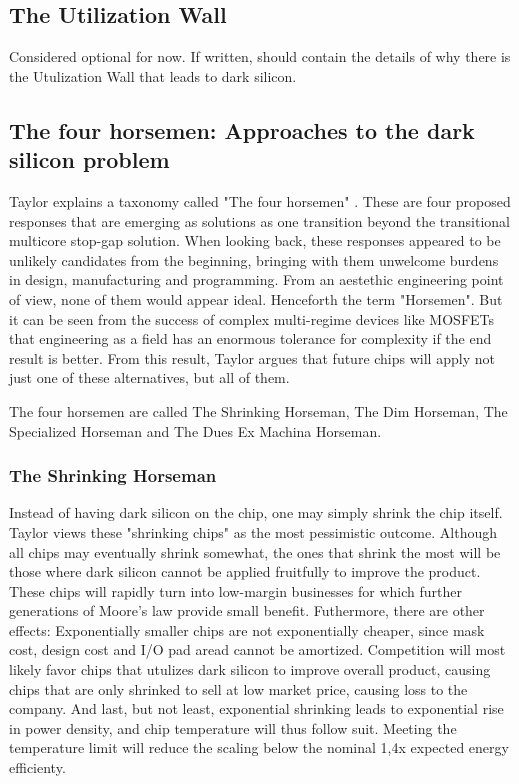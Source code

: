 \subsection{The Utilization Wall}
Considered optional for now.
If written, should contain the details of why there is the Utulization Wall that leads to dark silicon. 

\subsection{The four horsemen: Approaches to the dark silicon problem}
Taylor explains a taxonomy called "The four horsemen" \cite{dark-silicon}.
These are four proposed responses that are emerging as solutions as one transition beyond the transitional multicore stop-gap solution. \cite{dark-silicon2}
When looking back, these responses appeared to be unlikely candidates from the beginning, bringing with them unwelcome burdens in design, manufacturing and programming.
From an aestethic engineering point of view, none of them would appear ideal.
Henceforth the term "Horsemen".
But it can be seen from the success of complex multi-regime devices like MOSFETs that engineering as a field has an enormous tolerance for complexity if the end result is better.
From this result, Taylor argues that future chips will apply not just one of these alternatives, but all of them.

The four horsemen are called The Shrinking Horseman, The Dim Horseman, The Specialized Horseman and The Dues Ex Machina Horseman.

\subsubsection{The Shrinking Horseman}
Instead of having dark silicon on the chip, one may simply shrink the chip itself.
Taylor\cite{dark-silicon} views these "shrinking chips" as the most pessimistic outcome.
Although all chips may eventually shrink somewhat, the ones that shrink the most will be those where dark silicon cannot be applied fruitfully to improve the product.
These chips will rapidly turn into low-margin businesses for which further generations of Moore’s law provide small benefit.
Futhermore, there are other effects: Exponentially smaller chips are not exponentially cheaper, since mask cost, design cost and I/O pad aread cannot be amortized. 
Competition will most likely favor chips that utulizes dark silicon to improve overall product, causing chips that are only shrinked to sell at low market price, causing loss to the company.
And last, but not least, exponential shrinking leads to exponential rise in power density, and chip temperature will thus follow suit.
Meeting the temperature limit will reduce the scaling below the nominal 1,4x expected energy efficienty. 

